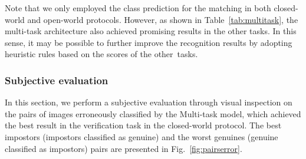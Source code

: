 Note that we only employed the class prediction for the matching in both closed-world and open-world protocols.
However, as shown in Table~\ref{tab:multitask}, the multi-task architecture also achieved promising results in the other tasks.
In this sense, it may be possible to further improve the recognition results by adopting heuristic rules based on the scores of the other~tasks.

\subsubsection{Subjective evaluation}
\label{sec:subjective}

In this section, we perform a subjective evaluation through visual inspection on the pairs of images erroneously classified by the Multi-task model, which achieved the best result in the verification task in the closed-world protocol.
The best impostors (impostors classified as genuine) and the worst genuines (genuine classified as impostors) pairs are presented in Fig.~\ref{fig:pairserror}.

